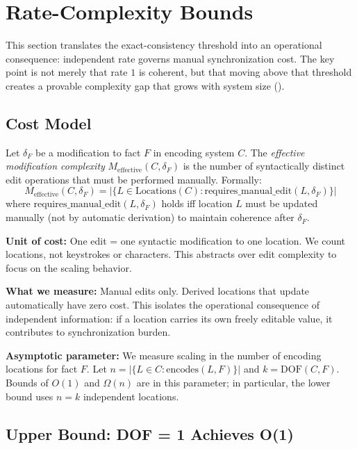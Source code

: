 \section{Rate-Complexity Bounds}\label{sec:bounds}

This section translates the exact-consistency threshold into an operational consequence: independent rate governs manual synchronization cost. The key point is not merely that rate $1$ is coherent, but that moving above that threshold creates a provable complexity gap that grows with system size ().

\subsection{Cost Model}\label{sec:cost-model}

\begin{definition}\label{def:cost-model}
Let $\delta_F$ be a modification to fact $F$ in encoding system $C$. The \emph{effective modification complexity} $M_{\text{effective}}(C, \delta_F)$ is the number of syntactically distinct edit operations that must be performed manually. Formally:
\[
M_{\text{effective}}(C, \delta_F) = |\{L \in \text{Locations}(C) : \text{requires\_manual\_edit}(L, \delta_F)\}|
\]
where $\text{requires\_manual\_edit}(L, \delta_F)$ holds iff location $L$ must be updated manually (not by automatic derivation) to maintain coherence after $\delta_F$.
\end{definition}

\textbf{Unit of cost:} One edit = one syntactic modification to one location. We count locations, not keystrokes or characters. This abstracts over edit complexity to focus on the scaling behavior.

\textbf{What we measure:} Manual edits only. Derived locations that update automatically have zero cost. This isolates the operational consequence of independent information: if a location carries its own freely editable value, it contributes to synchronization burden.

\textbf{Asymptotic parameter:} We measure scaling in the number of encoding locations for fact $F$. Let $n = |\{L \in C : \text{encodes}(L, F)\}|$ and $k = \text{DOF}(C, F)$. Bounds of $O(1)$ and $\Omega(n)$ are in this parameter; in particular, the lower bound uses $n = k$ independent locations.

\subsection{Upper Bound: DOF = 1 Achieves O(1)}\label{sec:upper-bound}

